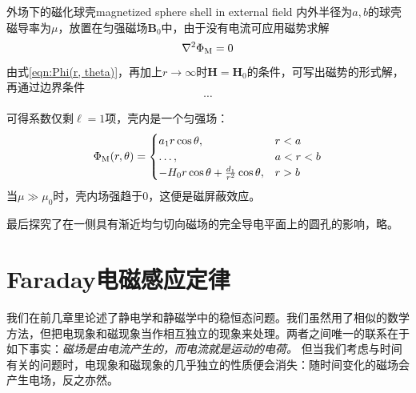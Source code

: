 \begin{example}{外场下的磁化球壳}{magnetized sphere shell in external field}
    内外半径为$a,b$的球壳磁导率为$\mu$，放置在匀强磁场$\bm B_0$中，由于没有电流可应用磁势求解
    \[
        \nabla^2\Phi_\text M=0
    \]
    由式\eqref{eqn:Phi(r, theta)}，再加上$r\to\infty$时$\bm H=\bm H_0$的条件，可写出磁势的形式解，再通过边界条件
    \[
        \cdots
    \]

    可得系数仅剩$\ell=1$项，壳内是一个匀强场：
    \[
        \Phi_\text M(r,\theta)=
        \begin{cases}
            a_1r\cos\theta,&r<a\\
            \ldots,&a<r<b\\
            -H_0r\cos\theta+\frac{d_1}{r^2}\cos\theta,&r>b
        \end{cases}
    \]
    当$\mu\gg\mu_0$时，壳内场强趋于0，这便是磁屏蔽效应。
\end{example}
最后探究了在一侧具有渐近均匀切向磁场的完全导电平面上的圆孔的影响，略。

\section{Faraday电磁感应定律}
\label{sec:Faraday}

我们在前几章里论述了静电学和静磁学中的稳恒态问题。我们虽然用了相似的数学方法，但把电现象和磁现象当作相互独立的现象来处理。两者之间唯一的联系在于如下事实：\textit{磁场是由电流产生的，而电流就是运动的电荷。}
但当我们考虑与时间有关的问题时，电现象和磁现象的几乎独立的性质便会消失：随时间变化的磁场会产生电场，反之亦然。%

